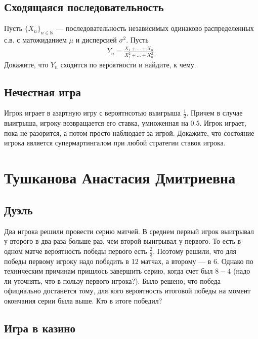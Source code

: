 \documentclass[12pt]{article}
\newcommand\N{\mathbb{N}}
\begin{document}
\subsection{Сходящаяся последовательность}

Пусть $\{X_n\}_{n \in \N}$ --- последовательность независимых одинаково распределенных с.в. с матожиданием $\mu$ и дисперсией $\sigma^2$. Пусть 
\begin{align*}
    Y_n = \frac{X_1 + \dots + X_n}{X_1^2 + \dots + X_n^2}.
\end{align*}
Докажите, что $Y_n$ сходится по вероятности и найдите, к чему.



\subsection{Нечестная игра}

Игрок играет в азартную игру с вероятнсотью выигрыша $\frac{1}{2}$. Причем в случае выигрыша, игроку возвращается его ставка, умноженная на $0.5$. Игрок играет, пока не разорится, а потом просто наблюдает за игрой. Докажите, что состояние игрока является супермартингалом при любой стратегии ставок игрока.



\newpage
\section{Тушканова Анастасия Дмитриевна}

\subsection{Дуэль}

Два игрока решили провести серию матчей. В среднем первый игрок выигрывал у второго в два раза больше раз, чем второй выигрывал у первого. То есть в одном матче вероятность победы первого есть $\frac{2}{3}$. Поэтому решили, что для победы первому игроку надо победить в 12 матчах, а второму --- в 6. Однако по техническим причинам пришлось завершить серию, когда счет был $8-4$ (надо ли уточнять, что в пользу первого игрока?). Было решено, что победа официально достанется тому, для кого вероятность итоговой победы на момент окончания серии была выше. Кто в итоге победил?



\subsection{Игра в казино}
\end{document}
